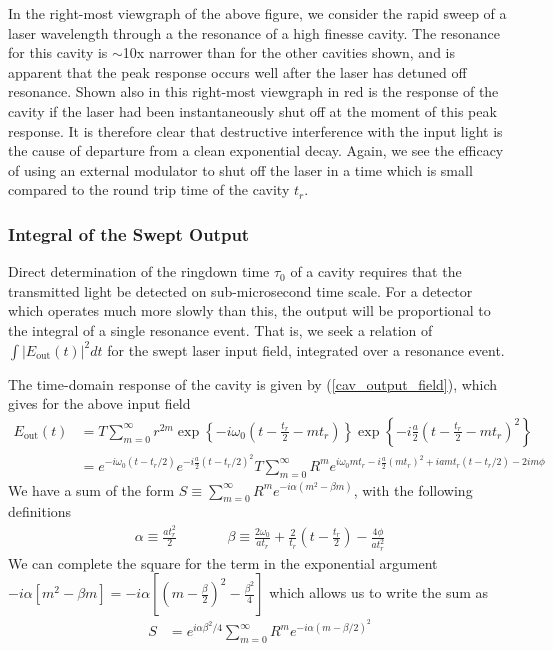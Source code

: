 In the right-most viewgraph of the above figure, we consider the rapid sweep of a laser wavelength through a the resonance of a high finesse cavity. The resonance for this cavity is $\sim$10x narrower than for the other cavities shown, and is apparent that the peak response occurs well after the laser has detuned off resonance. Shown also in this right-most viewgraph in red is the response of the cavity if the laser had been instantaneously shut off at the moment of this peak response. It is therefore clear that destructive interference with the input light is the cause of departure from a clean exponential decay. Again, we see the efficacy of using an external modulator to shut off the laser in a time which is small compared to the round trip time of the cavity $t_r$.

\subsubsection{Integral of the Swept Output}
Direct determination of the ringdown time $\tau_0$ of a cavity requires that the transmitted light be detected on sub-microsecond time scale. For a detector which operates much more slowly than this, the output will be proportional to the integral of a single resonance event. That is, we seek a relation of $\int \left|E_\mathrm{out}(t)\right|^2 dt$ for the swept laser input field, integrated over a resonance event.

The time-domain response of the cavity is given by (\ref{cav_output_field}), which gives for the above input field
\begin{align}
	E_\mathrm{out}(t) &= T\sum_{m=0}^{\infty}r^{2m}\exp\left\{-i\omega_0\left(t - \frac{t_r}{2} - mt_r\right)\right\} \exp\left\{ -i\frac{a}{2}\left(t - \frac{t_r}{2} - mt_r\right)^2\right\} \\
	&= e^{-i\omega_0\left(t - t_r/2\right)}e^{-i\frac{a}{2}\left(t - t_r/2\right)^2} T \sum_{m=0}^{\infty}R^{m}e^{i\omega_0 mt_r - i\frac{a}{2}\left(mt_r\right)^2 + iamt_r (t-t_r/2) - 2im\phi} 
\end{align}
We have a sum of the form $S\equiv \sum_{m=0}^{\infty}R^m e^{-i\alpha\left(m^2 - \beta m\right)}$, with the following definitions
\begin{eqnarray}
	\alpha \equiv \frac{at_r^2}{2} &\qquad& \beta \equiv \frac{2\omega_0}{at_r}+ \frac{2}{t_r}\left(t - \frac{t_r}{2}\right) - \frac{4\phi}{at_r^2}
\end{eqnarray}
We can complete the square for the term in the exponential argument \newline $-i\alpha\left[m^2 - \beta m\right] =  -i \alpha \left[\left(m-\frac{\beta}{2}\right)^2 - \frac{\beta^2}{4}\right]$ which allows us to write the sum as
\begin{align*}
	S &= e^{i\alpha \beta^2/4} \sum_{m=0}^{\infty}R^m e^{-i\alpha (m-\beta/2)^2}
\end{align*}

